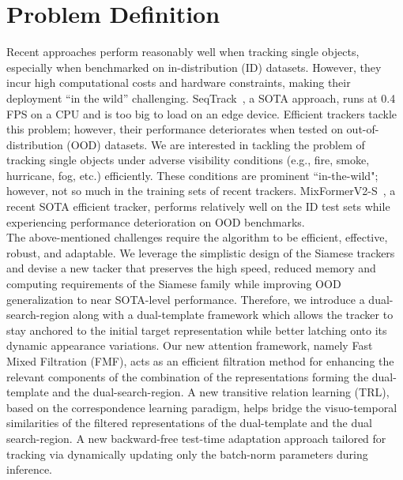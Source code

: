 \chapter{Problem Definition} %

\label{Chapter3} %

Recent approaches perform reasonably well when tracking single objects, especially when benchmarked on in-distribution (ID) datasets. 
However, they incur high computational costs and hardware constraints, making their deployment “in the wild” challenging. 
SeqTrack~\cite{chen2023seqtrack}, a SOTA approach, runs at 0.4 FPS on a CPU and is too big to load on an edge device.
Efficient trackers tackle this problem; however, their performance deteriorates when tested on out-of-distribution (OOD) datasets.
We are interested in tackling the problem of tracking single objects under adverse visibility conditions (e.g., fire, smoke, hurricane, fog, etc.) efficiently.
These conditions are prominent ``in-the-wild"; however, not so much in the training sets of recent trackers.
MixFormerV2-S~\cite{cui2024mixformerv2}, a recent SOTA efficient tracker, performs relatively well on the ID test sets while experiencing performance deterioration on OOD benchmarks. \\


The above-mentioned challenges require the algorithm to be efficient, effective, robust, and adaptable. 
We leverage the simplistic design of the Siamese trackers and devise a new tacker that preserves the high speed, reduced memory and computing requirements of the Siamese family while improving OOD generalization to near SOTA-level performance.
Therefore, we introduce a dual-search-region along with a dual-template framework which allows the tracker to stay anchored to the initial target representation while better latching onto its dynamic appearance variations.
Our new attention framework, namely Fast Mixed Filtration (FMF), acts as an efficient filtration method for enhancing the relevant components of the combination of the representations forming the dual-template and the dual-search-region.
A new transitive relation learning (TRL), based on the correspondence learning paradigm, helps bridge the visuo-temporal similarities of the filtered representations of the dual-template and the dual search-region.
A new backward-free test-time adaptation approach tailored for tracking via dynamically updating only the batch-norm parameters during inference.





